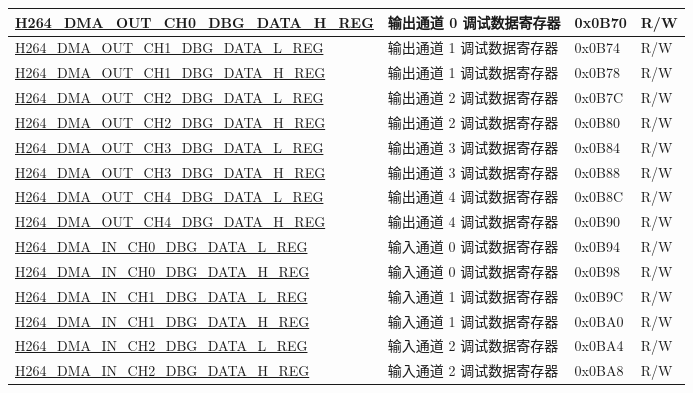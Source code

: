 \begin{longtable}{ | p{7.5cm} | p{5.7cm} | p{1.2cm} | p{1cm} | }
    \hyperref[regdesc:H264DMAOUTCH0DBGDATAHREG]{H264\_DMA\_OUT\_CH0\_DBG\_DATA\_H\_REG} & 输出通道 0 调试数据寄存器 & 0x0B70 & R/W \\ \hline
    \hyperref[regdesc:H264DMAOUTCH1DBGDATALREG]{H264\_DMA\_OUT\_CH1\_DBG\_DATA\_L\_REG} & 输出通道 1 调试数据寄存器 & 0x0B74 & R/W \\ \hline
    \hyperref[regdesc:H264DMAOUTCH1DBGDATAHREG]{H264\_DMA\_OUT\_CH1\_DBG\_DATA\_H\_REG} & 输出通道 1 调试数据寄存器 & 0x0B78 & R/W \\ \hline
    \hyperref[regdesc:H264DMAOUTCH2DBGDATALREG]{H264\_DMA\_OUT\_CH2\_DBG\_DATA\_L\_REG} & 输出通道 2 调试数据寄存器 & 0x0B7C & R/W \\ \hline
    \hyperref[regdesc:H264DMAOUTCH2DBGDATAHREG]{H264\_DMA\_OUT\_CH2\_DBG\_DATA\_H\_REG} & 输出通道 2 调试数据寄存器 & 0x0B80 & R/W \\ \hline
    \hyperref[regdesc:H264DMAOUTCH3DBGDATALREG]{H264\_DMA\_OUT\_CH3\_DBG\_DATA\_L\_REG} & 输出通道 3 调试数据寄存器 & 0x0B84 & R/W \\ \hline
    \hyperref[regdesc:H264DMAOUTCH3DBGDATAHREG]{H264\_DMA\_OUT\_CH3\_DBG\_DATA\_H\_REG} & 输出通道 3 调试数据寄存器 & 0x0B88 & R/W \\ \hline
    \hyperref[regdesc:H264DMAOUTCH4DBGDATALREG]{H264\_DMA\_OUT\_CH4\_DBG\_DATA\_L\_REG} & 输出通道 4 调试数据寄存器 & 0x0B8C & R/W \\ \hline
    \hyperref[regdesc:H264DMAOUTCH4DBGDATAHREG]{H264\_DMA\_OUT\_CH4\_DBG\_DATA\_H\_REG} & 输出通道 4 调试数据寄存器 & 0x0B90 & R/W \\ \hline
    \hyperref[regdesc:H264DMAINCH0DBGDATALREG]{H264\_DMA\_IN\_CH0\_DBG\_DATA\_L\_REG} & 输入通道 0 调试数据寄存器 & 0x0B94 & R/W \\ \hline
    \hyperref[regdesc:H264DMAINCH0DBGDATAHREG]{H264\_DMA\_IN\_CH0\_DBG\_DATA\_H\_REG} & 输入通道 0 调试数据寄存器 & 0x0B98 & R/W \\ \hline
    \hyperref[regdesc:H264DMAINCH1DBGDATALREG]{H264\_DMA\_IN\_CH1\_DBG\_DATA\_L\_REG} & 输入通道 1 调试数据寄存器 & 0x0B9C & R/W \\ \hline
    \hyperref[regdesc:H264DMAINCH1DBGDATAHREG]{H264\_DMA\_IN\_CH1\_DBG\_DATA\_H\_REG} & 输入通道 1 调试数据寄存器 & 0x0BA0 & R/W \\ \hline
    \hyperref[regdesc:H264DMAINCH2DBGDATALREG]{H264\_DMA\_IN\_CH2\_DBG\_DATA\_L\_REG} & 输入通道 2 调试数据寄存器 & 0x0BA4 & R/W \\ \hline
    \hyperref[regdesc:H264DMAINCH2DBGDATAHREG]{H264\_DMA\_IN\_CH2\_DBG\_DATA\_H\_REG} & 输入通道 2 调试数据寄存器 & 0x0BA8 & R/W \\ \hline

\end{longtable}
